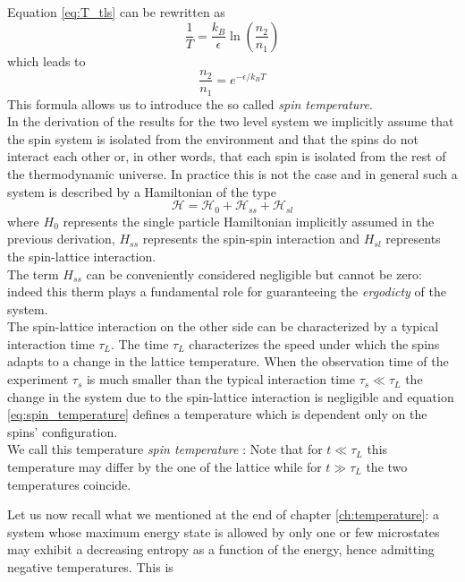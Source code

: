 Equation \ref{eq:T_tls} can be rewritten as
\begin{equation*}
    \frac{1}{T} = \frac{k_B}{\epsilon} \ln\left(\frac{n_2}{n_1}\right)
\end{equation*}
which leads to 
\begin{equation}
    \frac{n_2}{n_1} = e^{-\epsilon/k_BT}
    \label{eq:spin_temperature}
\end{equation}
This formula allows us to introduce the so called \emph{spin temperature}. \\
In the derivation of the results for the two level system we implicitly assume that the spin system is
isolated from the environment and that the spins do not interact each other or, in other words, that each spin is isolated from the rest of the thermodynamic universe.
In practice this is not the case and in general such a system is described by a Hamiltonian of the type
\begin{equation}
    \mathcal{H} = \mathcal{H}_0 + \mathcal{H}_{ss} + \mathcal{H}_{sl}
    \label{eq:Hamiltonian_lattice_spin}
\end{equation}
where $H_0$ represents the single particle Hamiltonian implicitly assumed in the previous derivation, $H_{ss}$ represents the spin-spin interaction and $H_{sl}$ represents the spin-lattice interaction. \\
The term $H_{ss}$ can be conveniently considered negligible but cannot be zero: indeed this therm plays a fundamental role for guaranteeing the \emph{ergodicty} of the system. \\
The spin-lattice interaction on the other side can be characterized by a typical interaction time $\tau_L$. The time $\tau_L$ characterizes the speed under which the spins adapts to a change in the lattice temperature. 
When the observation time of the experiment $\tau_s$ is much smaller than the typical interaction time $\tau_s \ll \tau_L$ the change in the system due to the spin-lattice interaction is negligible and equation \ref{eq:spin_temperature} defines a temperature which is dependent only on the spins' configuration. \\
We call this temperature \emph{spin temperature} \cite{Spin_temperature}: Note that for $t\ll \tau_L$ this temperature may differ by the one of the lattice while for $t \gg \tau_L$ the two temperatures coincide. \par
\vspace{10pt}
Let us now recall what we mentioned at the end of chapter \ref{ch:temperature}: a system whose maximum energy state is allowed by only one or few microstates may exhibit a decreasing entropy as a function of the energy, hence admitting negative temperatures. This is 
